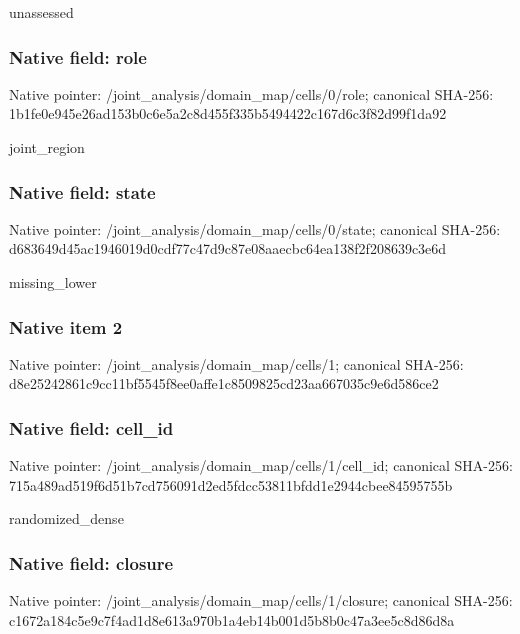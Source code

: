\documentclass[10pt,a4paper]{article}
\begin{document}
\begingroup\raggedright\sloppy unassessed\par\endgroup

\subsubsection{Native field: role}
Native pointer: /joint\_\allowbreak{}analysis/domain\_\allowbreak{}map/cells/0/role; canonical SHA-256: 1b1fe0e945e26ad153b0c6e5a2c8d455f335b5494422c167d6c3f82d99f1da92

\begingroup\raggedright\sloppy joint\_\allowbreak{}region\par\endgroup

\subsubsection{Native field: state}
Native pointer: /joint\_\allowbreak{}analysis/domain\_\allowbreak{}map/cells/0/state; canonical SHA-256: d683649d45ac1946019d0cdf77c47d9c87e08aaecbc64ea138f2f208639c3e6d

\begingroup\raggedright\sloppy missing\_\allowbreak{}lower\par\endgroup

\subsubsection{Native item 2}
Native pointer: /joint\_\allowbreak{}analysis/domain\_\allowbreak{}map/cells/1; canonical SHA-256: d8e25242861c9cc11bf5545f8ee0affe1c8509825cd23aa667035c9e6d586ce2

\subsubsection{Native field: cell\_\allowbreak{}id}
Native pointer: /joint\_\allowbreak{}analysis/domain\_\allowbreak{}map/cells/1/cell\_\allowbreak{}id; canonical SHA-256: 715a489ad519f6d51b7cd756091d2ed5fdcc53811bfdd1e2944cbee84595755b

\begingroup\raggedright\sloppy randomized\_\allowbreak{}dense\par\endgroup

\subsubsection{Native field: closure}
Native pointer: /joint\_\allowbreak{}analysis/domain\_\allowbreak{}map/cells/1/closure; canonical SHA-256: c1672a184c5e9c7f4ad1d8e613a970b1a4eb14b001d5b8b0c47a3ee5c8d86d8a
\end{document}
